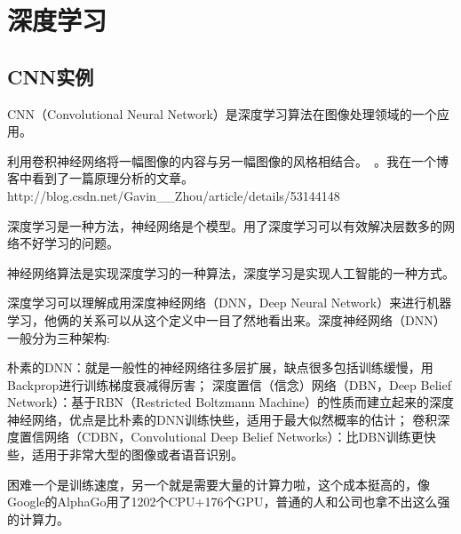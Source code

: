 \chapter{深度学习\cite{Lecun2015Deeplearning}}
\section{CNN实例}
CNN（Convolutional Neural Network）是深度学习算法在图像处理领域的一个应用。

利用卷积神经网络将一幅图像的内容与另一幅图像的风格相结合。~\cite{Johnson2015}。我在一个博客中看到了一篇原理分析的文章。
http://blog.csdn.net/Gavin__Zhou/article/details/53144148

深度学习是一种方法，神经网络是个模型。用了深度学习可以有效解决层数多的网络不好学习的问题。

神经网络算法是实现深度学习的一种算法，深度学习是实现人工智能的一种方式。

深度学习可以理解成用深度神经网络（DNN，Deep Neural Network）来进行机器学习，他俩的关系可以从这个定义中一目了然地看出来。深度神经网络（DNN）一般分为三种架构:
    
朴素的DNN：就是一般性的神经网络往多层扩展，缺点很多包括训练缓慢，用Backprop进行训练梯度衰减得厉害；
深度置信（信念）网络（DBN，Deep Belief Network）：基于RBN（Restricted Boltzmann Machine）的性质而建立起来的深度神经网络，优点是比朴素的DNN训练快些，适用于最大似然概率的估计；
卷积深度置信网络（CDBN，Convolutional Deep Belief Networks）：比DBN训练更快些，适用于非常大型的图像或者语音识别。
    
困难一个是训练速度，另一个就是需要大量的计算力啦，这个成本挺高的，像Google的AlphaGo用了1202个CPU+176个GPU，普通的人和公司也拿不出这么强的计算力。